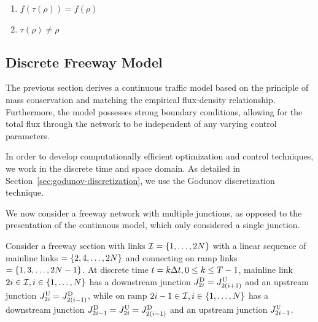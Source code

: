 \begin{enumerate}
	\item $f(\tau(\rho)) = f(\rho)$
	\item $\tau(\rho) \neq \rho$
\end{enumerate}

\subsection{Discrete Freeway Model}

The previous section derives a continuous traffic model based on the principle of mass conservation and matching the empirical flux-density relationship. Furthermore, the model possesses strong boundary conditions, allowing for the total flux through the network to be independent of any varying control parameters.

In order to develop computationally efficient optimization and control techniques, we work in the discrete time and space domain. As detailed in Section~\ref{sec:godunov-discretization}, we use the Godunov discretization technique.

We now consider a freeway network with multiple junctions, as opposed to the presentation of the continuous model, which only considered a single junction.

Consider a freeway section with links $\links=\intrange 1{2\nlinks}$
with a linear sequence of mainline links $=\intrange{2,4}{2\nlinks}$
and connecting on ramp links $=\intrange{1,3}{2\nlinks-1}$. At discrete
time $t=k\Delta t,0\le k\le T-1$, mainline link $2\link\in\links,i\in\intrange 1{\nlinks}$
has a downstream junction $\jdown{2\link}=\jup{2\left(\link+1\right)}$
and an upstream junction $\jup{2\link}=\jdown{2\left(\link-1\right)}$,
while on ramp $2\link-1\in\links,i\in\intrange 1{\nlinks}$ has a downstream
junction $\jdown{2\link-1}=\jup{2\link}=\jdown{2\left(\link-1\right)}$
and an upstream junction $J_{2i-1}^{\text{U}}$.

